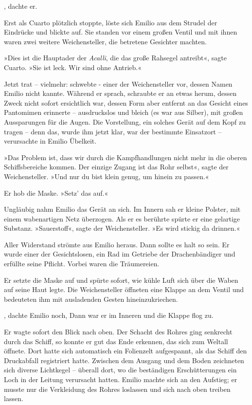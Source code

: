 \bigpar

, dachte er.

Erst als Cuarto plötzlich stoppte, löste sich Emilio aus dem
Strudel der Eindrücke und blickte auf. Sie standen vor einem großen
Ventil und mit ihnen waren zwei weitere Weichensteller, die
betretene Gesichter machten.

»Dies ist die Hauptader der \textit{Acalli}, die das große Rahsegel
antreibt«, sagte Cuarto. »Sie ist leck. Wir sind ohne Antrieb.«

Jetzt trat – vielmehr: schwebte - einer der Weichensteller vor,
dessen Namen Emilio nicht kannte. Während er sprach, schraubte er
an etwas herum, dessen Zweck nicht sofort ersichtlich war, dessen
Form aber entfernt an das Gesicht eines Pantomimen erinnerte –
ausdruckslos und bleich (es war aus Silber), mit großen
Aussparungen für die Augen. Die Vorstellung, ein solches Gerät auf
dem Kopf zu tragen – denn das, wurde ihm jetzt klar, war der
bestimmte Einsatzort – verursachte in Emilio Übelkeit.

\bigpar

»Das Problem ist, dass wir durch die Kampfhandlungen nicht mehr in
die oberen Schiffsbereiche kommen. Der einzige Zugang ist das Rohr
selbst«, sagte der Weichensteller. »Und nur du bist klein genug, um
hinein zu passen.«

Er hob die Maske. »Setz' das auf.«

Ungläubig nahm Emilio das Gerät an sich. Im Innern sah er kleine
Polster, mit einem wabenartigen Netz überzogen. Als er es berührte
spürte er eine gelartige Substanz. »Sauerstoff«, sagte der
Weichensteller. »Es wird stickig da drinnen.«

Aller Widerstand strömte aus Emilio heraus. Dann sollte es halt so
sein. Er wurde einer der Gesichtslosen, ein Rad im Getriebe der
Drachenbändiger und erfüllte seine Pflicht. Vorbei waren die
Träumereien.

Er setzte die Maske auf und spürte sofort, wie kühle Luft sich über
die Waben auf seine Haut legte. Die Weichensteller öffneten eine
Klappe an dem Ventil und bedeuteten ihm mit ausladenden Gesten
hineinzukriechen.

, dachte Emilio noch, 
Dann war er im Inneren und die Klappe flog zu.

Er wagte sofort den Blick nach oben. Der Schacht des Rohres ging
senkrecht durch das Schiff, so konnte er gut das Ende erkennen, das
sich zum Weltall öffnete. Dort hatte sich automatisch ein
Folienzelt aufgespannt, als das Schiff den Druckabfall registriert
hatte. Zwischen dem Ausgang und dem Boden zeichneten sich diverse
Lichtkegel – überall dort, wo die beständigen Erschütterungen ein
Loch in der Leitung verursacht hatten. Emilio machte sich an den
Aufstieg; er musste nur die Verkleidung des Rohres loslassen und
sich nach oben treiben lassen.


